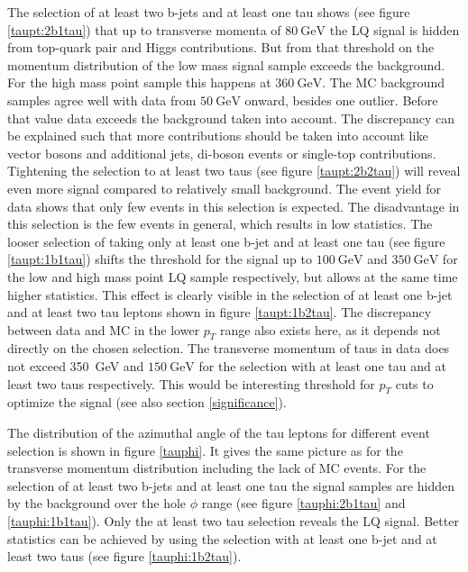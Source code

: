 %
The selection of at least two b-jets and at least one tau shows (see figure \ref{taupt:2b1tau}) that up to transverse momenta of $\SI{80}{\giga\electronvolt}$ the LQ signal is hidden from top-quark pair and Higgs contributions. But from that threshold on the momentum distribution of the low mass signal sample exceeds the background. For the high mass point sample this happens at $\SI{360}{\giga\electronvolt}$. The MC background samples agree well with data from $\SI{50}{\giga\electronvolt}$ onward, besides one outlier. Before that value data exceeds the background taken into account. The discrepancy can be explained such that more contributions should be taken into account like vector bosons and additional jets, di-boson events or single-top contributions. Tightening the selection to at least two taus (see figure \ref{taupt:2b2tau}) will reveal even more signal compared to relatively small background. The event yield for data shows that only few events in this selection is expected. The disadvantage in this selection is the few events in general, which results in low statistics. The looser selection of taking only at least one b-jet and at least one tau (see figure \ref{taupt:1b1tau}) shifts the threshold for the signal up to $\SI{100}{\giga\electronvolt}$ and $\SI{350}{\giga\electronvolt}$ for the low and high mass point LQ sample respectively, but allows at the same time higher statistics. This effect is clearly visible in the selection of at least one b-jet and at least two tau leptons shown in figure \ref{taupt:1b2tau}. The discrepancy between data and MC in the lower $p_T$ range also exists here, as it depends not directly on the chosen selection. The transverse momentum of taus in data does not exceed \SI{350}{\giga\electronvolt} and $\SI{150}{\giga\electronvolt}$ for the selection with at least one tau and at least two taus respectively. This would be interesting threshold for $p_T$ cuts to optimize the signal (see also section \ref{significance}).\par
The distribution of the azimuthal angle of the tau leptons for different event selection is shown in figure \ref{tauphi}. It gives the same picture as for the transverse momentum distribution including the lack of MC events. For the selection of at least two b-jets and at least one tau the signal samples are hidden by the background over the hole $\phi$ range (see figure \ref{tauphi:2b1tau} and \ref{tauphi:1b1tau}). Only the at least two tau selection reveals the LQ signal. Better statistics can be achieved by using the selection with at least one b-jet and at least two taus (see figure \ref{tauphi:1b2tau}).\par
